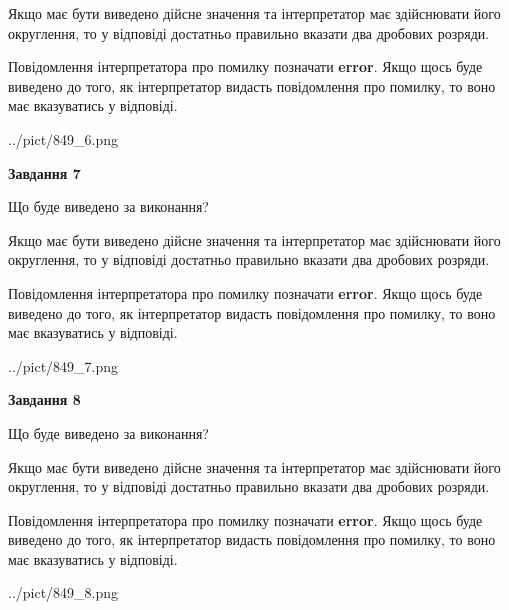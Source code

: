 \documentclass[12pt, ukrainian]{article}
\begin{document}
{\begin {Large}
Якщо має бути виведено дійсне значення та інтерпретатор має здійснювати його округлення, 
то у відповіді достатньо правильно вказати два дробових розряди.

Повідомлення інтерпретатора про помилку позначати \textbf{error}.
Якщо щось буде виведено до того, як інтерпретатор видасть повідомлення про помилку, 
то воно має вказуватись у відповіді. \par

\begin{center}
	{../pict/849_6.png}
\end{center}
\newpage

{\begin {center}\textbf{Завдання 7}\end {center}}\par
Що буде виведено за виконання? \par

Якщо має бути виведено дійсне значення та інтерпретатор має здійснювати його округлення, 
то у відповіді достатньо правильно вказати два дробових розряди.

Повідомлення інтерпретатора про помилку позначати \textbf{error}.
Якщо щось буде виведено до того, як інтерпретатор видасть повідомлення про помилку, 
то воно має вказуватись у відповіді. \par

\begin{center}
	{../pict/849_7.png}
\end{center}
\newpage

{\begin {center}\textbf{Завдання 8}\end {center}}\par
Що буде виведено за виконання? \par

Якщо має бути виведено дійсне значення та інтерпретатор має здійснювати його округлення, 
то у відповіді достатньо правильно вказати два дробових розряди.

Повідомлення інтерпретатора про помилку позначати \textbf{error}.
Якщо щось буде виведено до того, як інтерпретатор видасть повідомлення про помилку, 
то воно має вказуватись у відповіді. \par

\begin{center}
	{../pict/849_8.png}
\end{center}
\newpage


\end{Large}}
\end{document}

